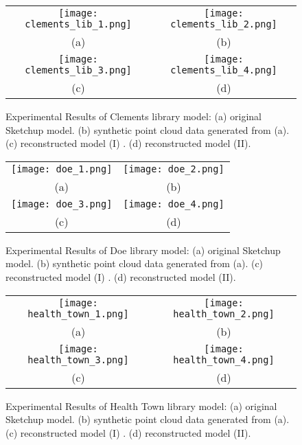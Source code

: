 \begin{figure} [htbp]
\begin{center}
\begin{tabular}{cc}
\texttt{[image: clements\_lib\_1.png]} &
\texttt{[image: clements\_lib\_2.png]} \\
(a) & (b) \\
\texttt{[image: clements\_lib\_3.png]} &
\texttt{[image: clements\_lib\_4.png]} \\
(c) & (d)
\end{tabular}
\end{center}
\caption{Experimental Results of Clements library model:
      (a) original Sketchup model.
      (b) synthetic point cloud data generated from (a).
      (c) reconstructed model (I) .
      (d) reconstructed model (II).}
\label{fig:ER_Fig5}
\end{figure}

\begin{figure} [htbp]
\begin{center}
\begin{tabular}{cc}
\texttt{[image: doe\_1.png]} &
\texttt{[image: doe\_2.png]} \\
(a) & (b) \\
\texttt{[image: doe\_3.png]} &
\texttt{[image: doe\_4.png]} \\
(c) & (d)
\end{tabular}
\end{center}
\caption{Experimental Results of Doe library model:
      (a) original Sketchup model.
      (b) synthetic point cloud data generated from (a).
      (c) reconstructed model (I) .
      (d) reconstructed model (II).}
\label{fig:ER_Fig6}
\end{figure}

\begin{figure} [htbp]
\begin{center}
\begin{tabular}{cc}
\texttt{[image: health\_town\_1.png]} &
\texttt{[image: health\_town\_2.png]} \\
(a) & (b) \\
\texttt{[image: health\_town\_3.png]} &
\texttt{[image: health\_town\_4.png]} \\
(c) & (d)
\end{tabular}
\end{center}
\caption{Experimental Results of Health Town library model:
      (a) original Sketchup model.
      (b) synthetic point cloud data generated from (a).
      (c) reconstructed model (I) .
      (d) reconstructed model (II).}
\label{fig:ER_Fig7}
\end{figure}

